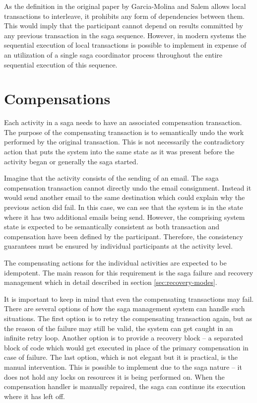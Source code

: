 \documentclass[oneside,
  digital, %
  table,   %
  nolof,     %
  nolot,     %
]{fithesis3}
\begin{document}
As the definition in the original paper by Garcia-Molina and Salem \cite{sagas_publ} allows local transactions to interleave, it prohibits any form of dependencies between them. This would imply that the participant cannot depend on results committed by any previous transaction in the saga sequence. However, in modern systems the sequential execution of local transactions is possible to implement in expense of an utilization of a single saga coordinator process throughout the entire sequential execution of this sequence. 

\section{Compensations}

Each activity in a saga needs to have an associated compensation transaction. The purpose of the compensating transaction is to semantically undo the work performed by the original transaction. This is not necessarily the contradictory action that puts the system into the same state as it was present before the activity began or generally the saga started. 

Imagine that the activity consists of the sending of an email. The saga compensation transaction cannot directly undo the email consignment. Instead it would send another email to the same destination which could explain why the previous action did fail. In this case, we can see that the system is in the state where it has two additional emails being send. However, the comprising system state is expected to be semantically consistent as both transaction and compensation have been defined by the participant. Therefore, the consistency guarantees must be ensured by individual participants at the activity level.

The compensating actions for the individual activities are expected to be idempotent. The main reason for this requirement is the saga failure and recovery management which in detail described in section \ref{sec:recovery-modes}.

It is important to keep in mind that even the compensating transactions may fail. There are several options of how the saga management system can handle such situations. The first option is to retry the compensating transaction again, but as the reason of the failure may still be valid, the system can get caught in an infinite retry loop. Another option is to provide a recovery block -- a separated block of code which would get executed in place of the primary compensation in case of failure. The last option, which is not elegant but it is practical, is the manual intervention. This is possible to implement due to the saga nature -- it does not hold any locks on resources it is being performed on. When the compensation handler is manually repaired, the saga can continue its execution where it has left off.
\end{document}
